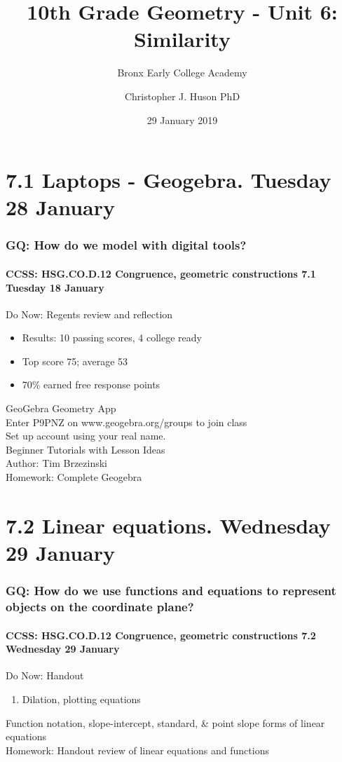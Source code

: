 \documentclass{beamer}
\title{10th Grade Geometry - Unit 6: Similarity}
\subtitle{Bronx Early College Academy}
\author{Christopher J. Huson PhD}
\date{29 January 2019}
\begin{document}
\frame{\titlepage}
\section[Outline]{}
\frame{\tableofcontents}


\section{7.1 Laptops - Geogebra. Tuesday 28 January}
  \frame
  {
    \frametitle{GQ: How do we model with digital tools?}
    \framesubtitle{CCSS: HSG.CO.D.12 Congruence, geometric constructions  \alert{7.1 Tuesday 18 January}}

    \begin{block}{Do Now: Regents review and reflection}
      \begin{itemize}
        \item Results: 10 passing scores, 4 college ready
        \item Top score 75; average 53
        \item 70\% earned free response points
      \end{itemize}
    \end{block}
    GeoGebra Geometry App\\
    Enter \alert{P9PNZ} on www.geogebra.org/groups to join class\\
    Set up account using your real name.\\
    Beginner Tutorials with Lesson Ideas\\
    Author: Tim Brzezinski\\[0.5cm]
    Homework: Complete Geogebra
  }

\section{7.2 Linear equations. Wednesday 29 January}
  \frame
  {
    \frametitle{GQ: How do we use functions and equations to represent objects on the coordinate plane?}
    \framesubtitle{CCSS: HSG.CO.D.12 Congruence, geometric constructions  \alert{7.2 Wednesday 29 January}}

    \begin{block}{Do Now: Handout}
      \begin{enumerate}
        \item Dilation, plotting equations
      \end{enumerate}
    \end{block}
    Function notation, slope-intercept, standard, \& point slope forms of linear equations\\[0.5cm]
    Homework: Handout review of linear equations and functions
  }
\end{document}
